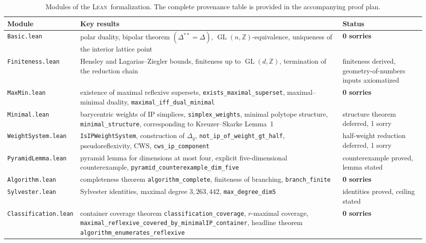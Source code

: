 \documentclass[appliedmath,article,submit,moreauthors]{Definitions/mdpi}
\newcommand{\Z}{\mathbb{Z}}
\newcommand{\GL}{\operatorname{GL}}
\newcommand{\Lean}{\textsc{Lean}}
\newcommand{\Dq}{\Delta_q}
\begin{document}
\begin{table}[H]
\caption{Modules of the \Lean\ formalization. The complete provenance table is
provided in the accompanying proof plan.\label{tab:lean}}
\small
\begin{tabularx}{\textwidth}{p{2.6cm}p{3.8cm}X}
\toprule
\textbf{Module} & \textbf{Key results} & \textbf{Status} \\
\midrule
\nolinkurl{Basic.lean} & polar duality, bipolar theorem
  \((\Delta^{**}=\Delta)\), \(\GL(n,\Z)\)-equivalence, uniqueness of the
  interior lattice point & \textbf{0 sorries} \\
\nolinkurl{Finiteness.lean} & Hensley and Lagarias--Ziegler bounds, finiteness
  up to \(\GL(d,\Z)\), termination of the reduction chain & finiteness derived,
  geometry-of-numbers inputs axiomatized~\cite{Hensley1983,LagariasZiegler1991} \\
\nolinkurl{MaxMin.lean} & existence of maximal reflexive supersets,
  \nolinkurl{exists\_maximal\_superset}, maximal--minimal duality,
  \nolinkurl{maximal\_iff\_dual\_minimal} & \textbf{0 sorries} \\
\nolinkurl{Minimal.lean} & barycentric weights of IP simplices,
  \nolinkurl{simplex\_weights}, minimal polytope structure,
  \nolinkurl{minimal\_structure}, corresponding to Kreuzer--Skarke Lemma~1 &
  structure theorem deferred, 1 sorry~\cite{KS97} \\
\nolinkurl{WeightSystem.lean} & \nolinkurl{IsIPWeightSystem}, construction of
  \(\Dq\), \nolinkurl{not\_ip\_of\_weight\_gt\_half}, pseudoreflexivity, CWS,
  \nolinkurl{cws\_ip\_component} & half-weight reduction deferred, 1
  sorry~\cite{Skarke1996,Scholler2019} \\
\nolinkurl{PyramidLemma.lean} & pyramid lemma for dimensions at most four,
  explicit five-dimensional counterexample,
  \nolinkurl{pyramid\_counterexample\_dim\_five} & counterexample proved, lemma
  stated~\cite{Skarke1996} \\
\nolinkurl{Algorithm.lean} & completeness theorem
  \nolinkurl{algorithm\_complete}, finiteness of branching,
  \nolinkurl{branch\_finite} & \textbf{0 sorries} \\
\nolinkurl{Sylvester.lean} & Sylvester identities, maximal degree
  \(3{,}263{,}442\), \nolinkurl{max\_degree\_dim5} & identities proved, ceiling
  stated~\cite{Scholler2019} \\
\nolinkurl{Classification.lean} & container coverage theorem
  \nolinkurl{classification\_coverage}, \(r\)-maximal coverage,
  \nolinkurl{maximal\_reflexive\_covered\_by\_minimalIP\_container}, headline
  theorem \nolinkurl{algorithm\_enumerates\_reflexive} & \textbf{0 sorries} \\
\bottomrule
\end{tabularx}
\end{table}
\end{document}
